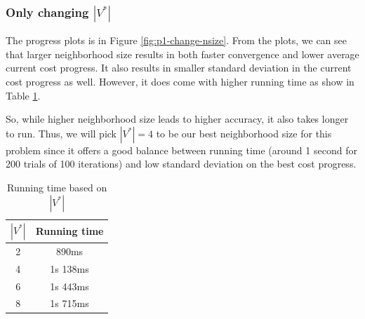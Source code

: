 \subsubsection{Only changing \(|V^*|\)}

The progress plots is in Figure \ref{fig:p1-change-nsize}. From the plots, we can see that larger neighborhood size results in both faster convergence and lower average current cost progress. It also results in smaller standard deviation in the current cost progress as well. However, it does come with higher running time as show in Table \ref{table:sample-time}.

So, while higher neighborhood size leads to higher accuracy, it also takes longer to run. Thus, we will pick \(|V^*|=4\) to be our best neighborhood size for this problem since it offers a good balance between running time (around 1 second for 200 trials of 100 iterations) and low standard deviation on the best cost progress.

\begin{table}[ht]
    \centering
    \begin{tabular}{c c}
        \toprule
        \(|V^*|\) & Running time \\
        \midrule
        2 & 890ms \\
        4 & 1s 138ms \\
        6 & 1s 443ms \\
        8 & 1s 715ms \\
        \bottomrule
    \end{tabular}
    \caption{Running time based on \(|V^*|\)}
    \label{table:sample-time}
\end{table}

